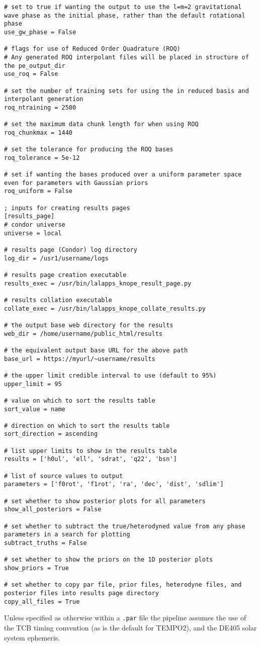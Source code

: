 \begin{lstlisting}[frame=single,basicstyle=\tiny\ttfamily]
# set to true if wanting the output to use the l=m=2 gravitational wave phase as the initial phase, rather than the default rotational phase
use_gw_phase = False

# flags for use of Reduced Order Quadrature (ROQ)
# Any generated ROQ interpolant files will be placed in structure of the pe_output_dir
use_roq = False

# set the number of training sets for using the in reduced basis and interpolant generation
roq_ntraining = 2500

# set the maximum data chunk length for when using ROQ
roq_chunkmax = 1440

# set the tolerance for producing the ROQ bases
roq_tolerance = 5e-12

# set if wanting the bases produced over a uniform parameter space even for parameters with Gaussian priors
roq_uniform = False

; inputs for creating results pages
[results_page]
# condor universe
universe = local

# results page (Condor) log directory
log_dir = /usr1/username/logs

# results page creation executable
results_exec = /usr/bin/lalapps_knope_result_page.py

# results collation executable
collate_exec = /usr/bin/lalapps_knope_collate_results.py

# the output base web directory for the results
web_dir = /home/username/public_html/results

# the equivalent output base URL for the above path
base_url = https://myurl/~username/results

# the upper limit credible interval to use (default to 95%)
upper_limit = 95

# value on which to sort the results table
sort_value = name

# direction on which to sort the results table
sort_direction = ascending

# list upper limits to show in the results table
results = ['h0ul', 'ell', 'sdrat', 'q22', 'bsn']

# list of source values to output
parameters = ['f0rot', 'f1rot', 'ra', 'dec', 'dist', 'sdlim']

# set whether to show posterior plots for all parameters
show_all_posteriors = False

# set whether to subtract the true/heterodyned value from any phase parameters in a search for plotting
subtract_truths = False

# set whether to show the priors on the 1D posterior plots
show_priors = True

# set whether to copy par file, prior files, heterodyne files, and posterior files into results page directory
copy_all_files = True
\end{lstlisting}

Unless specified as otherwise within a {\tt .par} file the pipeline assumes the use of the TCB timing convention (as is the default for TEMPO2), and the DE405
solar system ephemeris.


